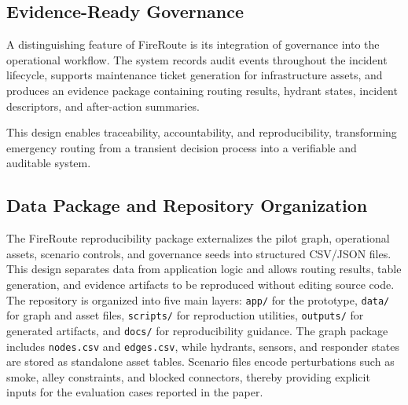 \subsection{Evidence-Ready Governance}

A distinguishing feature of FireRoute is its integration of governance into the operational workflow. The system records audit events throughout the incident lifecycle, supports maintenance ticket generation for infrastructure assets, and produces an evidence package containing routing results, hydrant states, incident descriptors, and after-action summaries.

This design enables traceability, accountability, and reproducibility, transforming emergency routing from a transient decision process into a verifiable and auditable system.

\subsection{Data Package and Repository Organization}

The FireRoute reproducibility package externalizes the pilot graph, operational assets, scenario controls, and governance seeds into structured CSV/JSON files. This design separates data from application logic and allows routing results, table generation, and evidence artifacts to be reproduced without editing source code. The repository is organized into five main layers: \texttt{app/} for the prototype, \texttt{data/} for graph and asset files, \texttt{scripts/} for reproduction utilities, \texttt{outputs/} for generated artifacts, and \texttt{docs/} for reproducibility guidance. The graph package includes \texttt{nodes.csv} and \texttt{edges.csv}, while hydrants, sensors, and responder states are stored as standalone asset tables. Scenario files encode perturbations such as smoke, alley constraints, and blocked connectors, thereby providing explicit inputs for the evaluation cases reported in the paper.